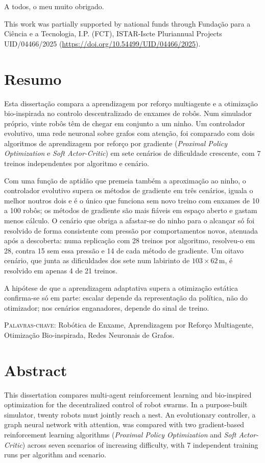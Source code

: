 \documentclass[12pt,reqno, twoside]{amsbook}
\theoremstyle{plain}
\numberwithin{equation}{chapter}
\numberwithin{section}{chapter}
\numberwithin{table}{chapter}
\numberwithin{figure}{chapter}
\begin{document}
A todos, o meu muito obrigado.

\vspace{2ex}
\noindent This work was partially supported by national funds through Fundação para a Ciência e a Tecnologia, I.P. (FCT), ISTAR-Iscte Pluriannual Projects UID/04466/2025 (\url{https://doi.org/10.54499/UID/04466/2025}).

\chapter*{Resumo}
Esta dissertação compara a aprendizagem por reforço multiagente e a otimização bio-inspirada no controlo descentralizado de enxames de robôs. Num simulador próprio, vinte robôs têm de chegar em conjunto a um ninho. Um controlador evolutivo, uma rede neuronal sobre grafos com atenção, foi comparado com dois algoritmos de aprendizagem por reforço por gradiente (\textit{Proximal Policy Optimization} e \textit{Soft Actor-Critic}) em sete cenários de dificuldade crescente, com 7 treinos independentes por algoritmo e cenário.

Com uma função de aptidão que premeia também a aproximação ao ninho, o controlador evolutivo supera os métodos de gradiente em três cenários, iguala o melhor noutros dois e é o único que funciona sem novo treino com enxames de 10 a 100 robôs; os métodos de gradiente são mais fiáveis em espaço aberto e gastam menos cálculo. O cenário que obriga a afastar-se do ninho para o alcançar só foi resolvido de forma consistente com pressão por comportamentos novos, atenuada após a descoberta: numa replicação com 28 treinos por algoritmo, resolveu-o em 28, contra 15 sem essa pressão e 14 de cada método de gradiente. Um oitavo cenário, que junta as dificuldades dos sete num labirinto de $103 \times 62$\,m, é resolvido em apenas 4 de 21 treinos.

A hipótese de que a aprendizagem adaptativa supera a otimização estática confirma-se só em parte: escalar depende da representação da política, não do otimizador; nos cenários enganadores, depende do sinal de treino.

\vspace{3ex}
\textsc{Palavras-chave:} Robótica de Enxame, Aprendizagem por Reforço Multiagente, Otimização Bio-inspirada, Redes Neuronais de Grafos.

\chapter*{Abstract}
This dissertation compares multi-agent reinforcement learning and bio-inspired optimization for the decentralized control of robot swarms. In a purpose-built simulator, twenty robots must jointly reach a nest. An evolutionary controller, a graph neural network with attention, was compared with two gradient-based reinforcement learning algorithms (\emph{Proximal Policy Optimization} and \emph{Soft Actor-Critic}) across seven scenarios of increasing difficulty, with 7 independent training runs per algorithm and scenario.
\end{document}
